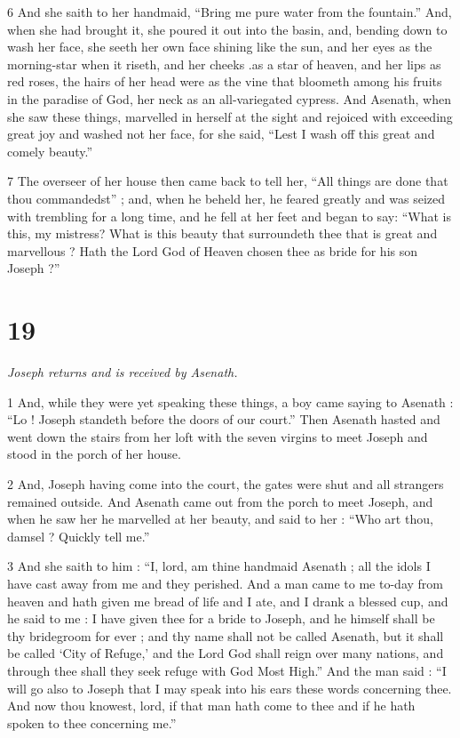 6 And she saith to her handmaid, “Bring me pure water from the fountain.” And, when she had brought it, she poured it out into the basin, and, bending down to wash her face, she seeth her own face shining like the sun, and her eyes as the morning-star when it riseth, and her cheeks .as a star of heaven, and her lips as red roses, the hairs of her head were as the vine that bloometh among his fruits in the paradise of God, her neck as an all-variegated cypress. And Asenath, when she saw these things, marvelled in herself at the sight and rejoiced with exceeding great joy and washed not her face, for she said, “Lest I wash off this great and comely beauty.” 

7 The overseer of her house then came back to tell her, “All things are done that thou commandedst” ; and, when he beheld her, he feared greatly and was seized with trembling for a long time, and he fell at her feet and began to say: “What is this, my mistress? What is this beauty that surroundeth thee that is great and marvellous ? Hath the Lord God of Heaven chosen thee as bride for his son Joseph ?”

\chapter{19}

\par \textit{Joseph returns and is received by Asenath.}

1 And, while they were yet speaking these things, a boy came saying to Asenath : “Lo ! Joseph standeth before the doors of our court.” Then Asenath hasted and went down the stairs from her loft with the seven virgins to meet Joseph and stood in the porch of her house. 

2 And, Joseph having come into the court, the gates were shut and all strangers remained outside. And Asenath came out from the porch to meet Joseph, and when he saw her he marvelled at her beauty, and said to her : “Who art thou, damsel ? Quickly tell me.” 

3 And she saith to him : “I, lord, am thine handmaid Asenath ; all the idols I have cast away from me and they perished. And a man came to me to-day from heaven and hath given me bread of life and I ate, and I drank a blessed cup, and he said to me : I have given thee for a bride to Joseph, and he himself shall be thy bridegroom for ever ; and thy name shall not be called Asenath, but it shall be called ‘City of Refuge,’ and the Lord God shall reign over many nations, and through thee shall they seek refuge with God Most High.” And the man said : “I will go also to Joseph that I may speak into his ears these words concerning thee. And now thou knowest, lord, if that man hath come to thee and if he hath spoken to thee concerning me.” 

